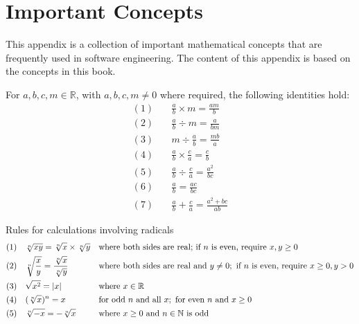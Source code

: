 \chapter{Important Concepts}
\label{chap:ic}

This appendix is a collection of important mathematical concepts that are frequently used in software engineering. 
The content of this appendix is based on the concepts in this book.


\begin{proposition}
For $a,b,c,m \in \mathbb{R}$, with $a,b,c,m \neq 0$ where required, the following identities hold:
\begingroup
\setlength{\jot}{8pt} %
\begin{align*}
(1) & \quad \frac{a}{b} \times m = \frac{am}{b} \\
(2) & \quad \frac{a}{b} \div m = \frac{a}{bm} \\
(3) & \quad m \div \frac{a}{b} = \frac{mb}{a} \\
(4) & \quad \frac{a}{b} \times \frac{c}{a} = \frac{c}{b} \\
(5) & \quad \frac{a}{b} \div \frac{c}{a} = \frac{a^2}{bc} \\
(6) & \quad \frac{a}{b} = \frac{ac}{bc} \\
(7) & \quad \frac{a}{b} + \frac{c}{a} = \frac{a^2 + bc}{ab}
\end{align*}
\endgroup
\end{proposition}

\begin{proposition}{Rules for calculations involving radicals}
    \begin{align*}
    &(1) \quad \sqrt[n]{x y}=\sqrt[n]{x} \times \sqrt[n]{y}   &   &\textnormal{where both sides are real; if }n\textnormal{ is even, require }x,y\geq0\\
    &(2) \quad \sqrt[n]{\frac{x}{y}} = \frac{\sqrt[n]{x}}{\sqrt[n]{y}}    &   &\textnormal{where both sides are real and }y\neq0;\textnormal{ if }n\textnormal{ is even, require }x\geq0,y>0 \\
    &(3) \quad \sqrt{x^2} = |x|   &   &\textnormal{where } x \in \mathbb{R} \\
    &(4) \quad (\sqrt[n]{x})^n = x    &   &\textnormal{for odd }n\textnormal{ and all }x;\ \textnormal{for even }n\textnormal{ and }x\geq0\\
    &(5) \quad \sqrt[n]{-x}=-\sqrt[n]{x}  &   &\textnormal{where } x \geq 0 \textnormal{ and } n \in \mathbb{N} \textnormal{ is odd }
    \end{align*}
\end{proposition}

